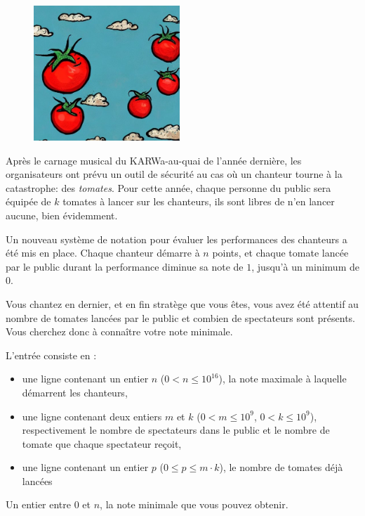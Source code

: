 \problemname{\problemyamlname}

\begin{figure}
    \centering
    \includegraphics[width=5.5cm]{tomates.jpeg}
\end{figure}

Après le carnage musical du KARWa-au-quai de l'année dernière, les organisateurs ont prévu un outil de sécurité au cas où un chanteur tourne à la catastrophe: des \emph{tomates}. Pour cette année, chaque personne du public sera équipée de $k$ tomates à lancer sur les chanteurs, ils sont libres de n'en lancer aucune, bien évidemment.

Un nouveau système de notation pour évaluer les performances des chanteurs a été mis en place. Chaque chanteur démarre à $n$ points, et chaque tomate lancée par le public durant la performance diminue sa note de $1$, jusqu'à un minimum de $0$.

Vous chantez en dernier, et en fin stratège que vous êtes, vous avez été attentif au nombre de tomates lancées par le public et combien de spectateurs sont présents. Vous cherchez donc à connaître votre note minimale.

\begin{Input}
	L'entrée consiste en :
	\begin{itemize}
		\item une ligne contenant un entier $n$ ($0 < n \le 10^{16}$), la note maximale à laquelle démarrent les chanteurs,
		\item une ligne contenant deux entiers $m$ et $k$ ($0 < m \le 10^9$, $0 < k \le 10^9$), respectivement le nombre de spectateurs dans le public et le nombre de tomate que chaque spectateur reçoit,
		\item une ligne contenant un entier $p$ ($0 \le p \le m \cdot k$), le nombre de tomates déjà lancées
	\end{itemize}
\end{Input}

\begin{Output}
	Un entier entre $0$ et $n$, la note minimale que vous pouvez obtenir.
\end{Output}
